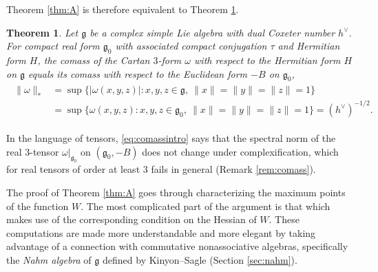 \documentclass[leqno,10pt]{amsart}
\newtheorem{theorem}{Theorem}[section]
\theoremstyle{definition}
\numberwithin{equation}{section}
\newcommand{\om}{\omega}
\newcommand{\g}{\mathfrak{g}}
\newcommand{\gz}{\g_{0}}
\newcommand{\hv}{h^\vee}
\newcommand{\norm}[1]{\lVert #1\rVert}
\newcommand{\comass}[1]{\lVert #1\rVert_{\ast}}%
\begin{document}
Theorem \ref{thm:A} is therefore equivalent to Theorem \ref{thm:comass}.
\begin{theorem}\label{thm:comass}
Let $\g$ be a complex simple Lie algebra with dual Coxeter number $\hv$. For compact real form $\gz$ with associated compact conjugation $\tau$ and Hermitian form $H$, the comass of the Cartan $3$-form $\om$ with respect to the Hermitian form $H$ on $\g$ equals its comass with respect to the Euclidean form $-B$ on $\gz$,
\begin{align}\label{eq:comassintro}
\begin{aligned}
\comass{\om} &= \sup\big\{|\om(x, y, z)|: x, y, z \in \g,\ \norm{x} = \norm{y} = \norm{z} = 1\big\}\\
&= \sup\big\{\om(x, y, z): x, y, z \in \gz,\ \norm{x} = \norm{y} = \norm{z} = 1\big\} = (\hv)^{-1/2}.
\end{aligned}
\end{align}
\end{theorem}
In the language of tensors, \eqref{eq:comassintro} says that the spectral norm of the real $3$-tensor $\om|_{\gz}$ on $(\gz, -B)$ does not change under complexification, which for real tensors of order at least $3$ fails in general (Remark \ref{rem:comass}).

The proof of Theorem \ref{thm:A} goes through characterizing the maximum points of the function $W$. The most complicated part of the argument is that which makes use of the corresponding condition on the Hessian of $W$. These computations are made more understandable and more elegant by taking advantage of a connection with commutative nonassociative algebras, specifically the \emph{Nahm algebra} of $\g$ defined by Kinyon--Sagle \cite{Kinyon-Sagle} (Section \ref{sec:nahm}).
\end{document}

